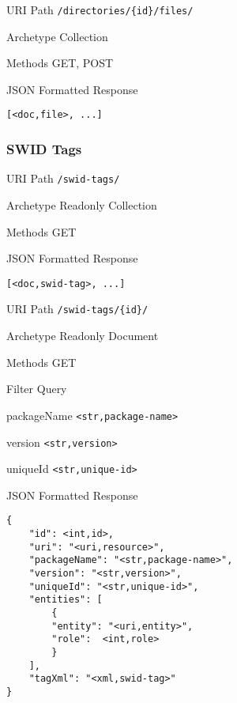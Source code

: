 \documentclass[10pt,a4paper]{scrartcl}
\begin{document}
\begin{mdframed}[style=def]
\begin{description*}
	\item[URI Path] \texttt{/directories/\{id\}/files/}
	\item[Archetype] Collection
	\item[Methods] GET, POST
	\item[JSON Formatted Response] \hfill
\begin{lstlisting}
[<doc,file>, ...]
\end{lstlisting}
\end{description*}
\end{mdframed}


\pagebreak


\subsubsection{SWID Tags}

\begin{mdframed}[style=def]
\begin{description*}
	\item[URI Path] \texttt{/swid-tags/}
	\item[Archetype] Readonly Collection
	\item[Methods] GET
	\item[JSON Formatted Response] \hfill
\begin{lstlisting}
[<doc,swid-tag>, ...]
\end{lstlisting}
\end{description*}
\end{mdframed}

\begin{mdframed}[style=def]
\begin{description*}
	\item[URI Path] \texttt{/swid-tags/\{id\}/}
	\item[Archetype] Readonly Document
	\item[Methods] GET
	\item[Filter Query] \hfill
	\begin{description*}
		\item[packageName] \texttt{<str,package-name>}
		\item[version] \texttt{<str,version>}
		\item[uniqueId] \texttt{<str,unique-id>}
	\end{description*}
	\item[JSON Formatted Response] \hfill
\begin{lstlisting}
{
	"id": <int,id>,
	"uri": "<uri,resource>",
	"packageName": "<str,package-name>",
	"version": "<str,version>",
	"uniqueId": "<str,unique-id>",
	"entities": [
		{
		"entity": "<uri,entity>",
		"role":  <int,role>
		}
	],
	"tagXml": "<xml,swid-tag>"
}
\end{lstlisting}
\end{description*}
\end{mdframed}
\end{document}
